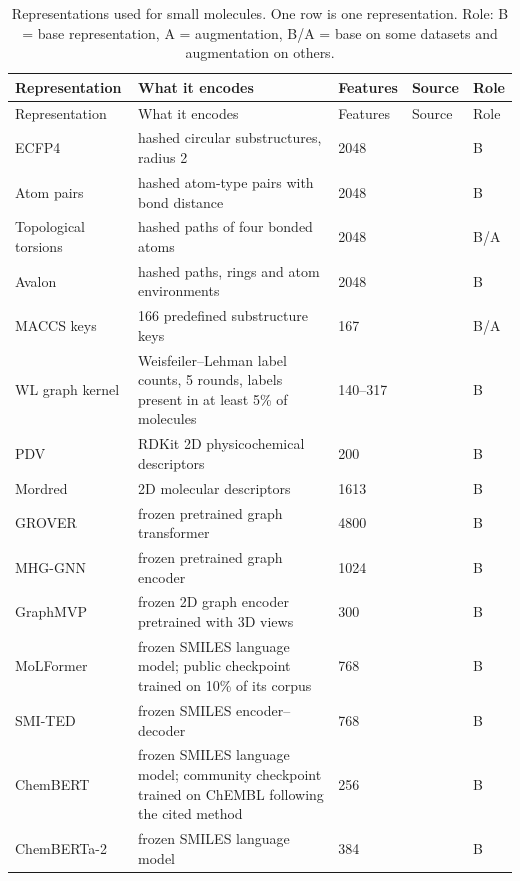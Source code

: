 \begin{longtable}{P{3.0cm}P{5.0cm}P{1.5cm}P{1.5cm}P{1.4cm}}
\caption[Representations used for small molecules.]{Representations used for small molecules. One row is one representation. Role: B = base representation, A = augmentation, B/A = base on some datasets and augmentation on others.}\label{tab:reps_smallmol}\\
\toprule
Representation & What it encodes & Features & Source & Role \\
\midrule
\endfirsthead
\toprule
Representation & What it encodes & Features & Source & Role \\
\midrule
\endhead
\bottomrule
\endfoot
ECFP4 & hashed circular substructures, radius 2 & 2048 & \citep{rogers2010} & B \\
Atom pairs & hashed atom-type pairs with bond distance & 2048 & \citep{Carhart1985} & B \\
Topological torsions & hashed paths of four bonded atoms & 2048 & \citep{Nilakantan1987} & B/A \\
Avalon & hashed paths, rings and atom environments & 2048 & \citep{Gedeck2006} & B \\
MACCS keys & 166 predefined substructure keys & 167 & \citep{Durant2002} & B/A \\
WL graph kernel & Weisfeiler--Lehman label counts, 5 rounds, labels present in at least 5\% of molecules & 140--317 & \citep{Shervashidze2011} & B \\
PDV & RDKit 2D physicochemical descriptors & 200 & \citep{rdkit} & B \\
Mordred & 2D molecular descriptors & 1613 & \citep{Moriwaki2018} & B \\
GROVER & frozen pretrained graph transformer & 4800 & \citep{Rong2020GROVER} & B \\
MHG-GNN & frozen pretrained graph encoder & 1024 & \citep{kishimoto2023} & B \\
GraphMVP & frozen 2D graph encoder pretrained with 3D views & 300 & \citep{Liu2022GraphMVP} & B \\
MoLFormer & frozen SMILES language model; public checkpoint trained on 10\% of its corpus & 768 & \citep{ross2022} & B \\
SMI-TED & frozen SMILES encoder--decoder & 768 & \citep{Soares2025} & B \\
ChemBERT & frozen SMILES language model; community checkpoint trained on ChEMBL following the cited method & 256 & \citep{Zhang2022ChemBERT} & B \\
ChemBERTa-2 & frozen SMILES language model & 384 & \citep{Ahmad2022} & B \\

\end{longtable}

